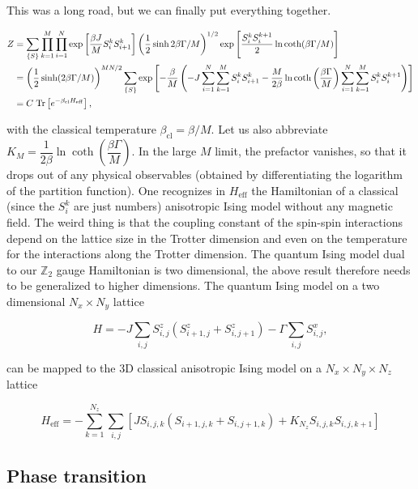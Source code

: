 \documentclass[11pt,openany]{article}
\begin{document}
This was a long road, but we can finally put everything together.

\begin{align*}
	Z &= \sum_{\left\{S\right\}}\prod_{k=1}^M\prod_{i=1}^N\exp\left[\frac{\beta J}{M}S_i^kS_{i+1}^k\right]\left(\frac{1}{2}\sinh{2\beta\Gamma/M}\right)^{1/2}\exp\left[\frac{S_i^kS_i^{k+1}}{2}\ln\coth(\beta\Gamma/M)\right]\\
	&= \left(\frac{1}{2}\sinh(2\beta\Gamma/M)\right)^{MN/2}\sum_{\left\{S\right\}}\exp\left[-\frac{\beta}{M}\left(-J\sum_{i=1}^N\sum_{k=1}^M S_i^k S_{i+1}^k - \frac{M}{2\beta}\ln\coth\left(\dfrac{\beta\Gamma}{M}\right)\sum_{i=1}^N\sum_{k=1}^M S_i^k S_i^{k+1}\right)\right]\\
	&= C\hspace{1mm}\mathrm{Tr}\left[e^{-\beta_\mathrm{cl}H_\mathrm{eff}}\right],
\end{align*}

with the classical temperature $\beta_\mathrm{cl} = \beta/M$. Let us also abbreviate $K_M = \dfrac{1}{2\beta}\ln\coth\left(\dfrac{\beta\Gamma}{M}\right)$. In the large $M$ limit, the prefactor vanishes, so that it drops out of any physical observables (obtained by differentiating the logarithm of the partition function). One recognizes in $H_\mathrm{eff}$ the Hamiltonian of a classical (since the $S_i^k$ are just numbers) anisotropic Ising model without any magnetic field. The weird thing is that the coupling constant of the spin-spin interactions depend on the lattice size in the Trotter dimension and even on the temperature for the interactions along the Trotter dimension. The quantum Ising model dual to our $\mathds{Z}_2$ gauge Hamiltonian is two dimensional, the above result therefore needs to be generalized to higher dimensions. The quantum Ising model on a two dimensional $N_x\times N_y$ lattice

\begin{equation}
	H = -J\sum_{i,j}S^z_{i,j}\left(S^z_{i+1,j} + S^z_{i,j+1}\right) -\Gamma\sum_{i,j}S^x_{i,j},
\end{equation}

can be mapped to the 3D classical anisotropic Ising model on a $N_x\times N_y \times N_z$ lattice

\begin{equation}
	H_\mathrm{eff} = -\sum_{k=1}^{N_z}\sum_{i,j}\left[J S_{i,j,k}\left(S_{i+1,j,k} + S_{i,j+1,k}\right) + K_{N_z} S_{i,j,k}S_{i,j,k+1}\right]
\end{equation}


\subsection{Phase transition}
\end{document}
